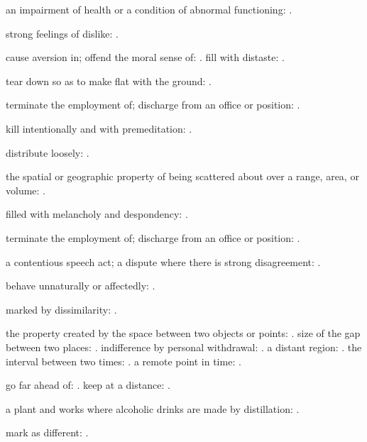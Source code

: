   an impairment of health or a condition of abnormal functioning: .

  strong feelings of dislike: .

  cause aversion in; offend the moral sense of: . fill with distaste: .

  tear down so as to make flat with the ground: .

  terminate the employment of; discharge from an office or position: .

  kill intentionally and with premeditation: .

  distribute loosely: .

  the spatial or geographic property of being scattered about over a range, area, or volume: .

  filled with melancholy and despondency: .

  terminate the employment of; discharge from an office or position: .

  a contentious speech act; a dispute where there is strong disagreement: .

  behave unnaturally or affectedly: .

  marked by dissimilarity: .

  the property created by the space between two objects or points:   . size of the gap between two places:   . indifference by personal withdrawal:   . a distant region:   . the interval between two times:   . a remote point in time:   .

  go far ahead of:   . keep at a distance:   .

  a plant and works where alcoholic drinks are made by distillation: .

  mark as different: .

